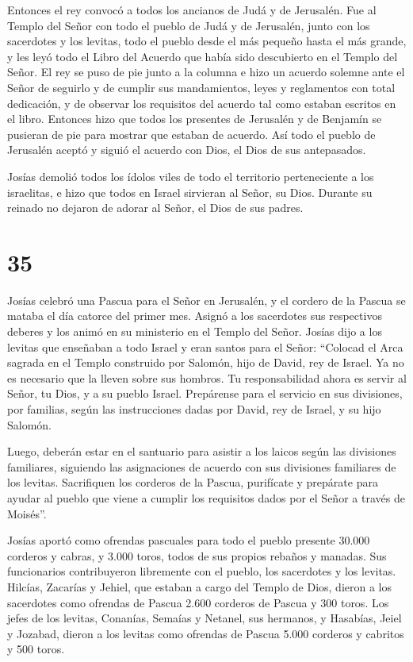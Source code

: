  Entonces el rey convocó a todos los ancianos de Judá y de
Jerusalén.  Fue al Templo del Señor con todo el pueblo de
Judá y de Jerusalén, junto con los sacerdotes y los levitas, todo el
pueblo desde el más pequeño hasta el más grande, y les leyó todo el
Libro del Acuerdo que había sido descubierto en el Templo del Señor.
 El rey se puso de pie junto a la columna e hizo un acuerdo
solemne ante el Señor de seguirlo y de cumplir sus mandamientos, leyes y
reglamentos con total dedicación, y de observar los requisitos del
acuerdo tal como estaban escritos en el libro.  Entonces
hizo que todos los presentes de Jerusalén y de Benjamín se pusieran de
pie para mostrar que estaban de acuerdo. Así todo el pueblo de Jerusalén
aceptó y siguió el acuerdo con Dios, el Dios de sus antepasados.

 Josías demolió todos los ídolos viles de todo el
territorio perteneciente a los israelitas, e hizo que todos en Israel
sirvieran al Señor, su Dios. Durante su reinado no dejaron de adorar al
Señor, el Dios de sus padres.

\hypertarget{section-34}{%
\section{35}\label{section-34}}

 Josías celebró una Pascua para el Señor en Jerusalén, y el
cordero de la Pascua se mataba el día catorce del primer mes.
 Asignó a los sacerdotes sus respectivos deberes y los animó
en su ministerio en el Templo del Señor.  Josías dijo a los
levitas que enseñaban a todo Israel y eran santos para el Señor:
``Colocad el Arca sagrada en el Templo construido por Salomón, hijo de
David, rey de Israel. Ya no es necesario que la lleven sobre sus
hombros. Tu responsabilidad ahora es servir al Señor, tu Dios, y a su
pueblo Israel.  Prepárense para el servicio en sus
divisiones, por familias, según las instrucciones dadas por David, rey
de Israel, y su hijo Salomón.

 Luego, deberán estar en el santuario para asistir a los
laicos según las divisiones familiares, siguiendo las asignaciones de
acuerdo con sus divisiones familiares de los levitas. 
Sacrifiquen los corderos de la Pascua, purifícate y prepárate para
ayudar al pueblo que viene a cumplir los requisitos dados por el Señor a
través de Moisés''.

 Josías aportó como ofrendas pascuales para todo el pueblo
presente 30.000 corderos y cabras, y 3.000 toros, todos de sus propios
rebaños y manadas.  Sus funcionarios contribuyeron
libremente con el pueblo, los sacerdotes y los levitas. Hilcías,
Zacarías y Jehiel, que estaban a cargo del Templo de Dios, dieron a los
sacerdotes como ofrendas de Pascua 2.600 corderos de Pascua y 300 toros.
 Los jefes de los levitas, Conanías, Semaías y Netanel, sus
hermanos, y Hasabías, Jeiel y Jozabad, dieron a los levitas como
ofrendas de Pascua 5.000 corderos y cabritos y 500 toros.

